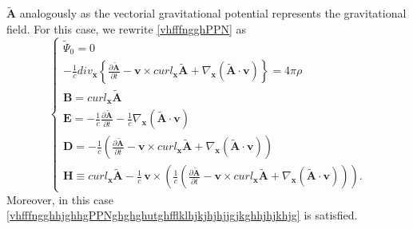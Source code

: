 \documentclass{article}
\theoremstyle{definition}
\theoremstyle{remark}
\renewcommand{\vec}[1]{\mathbf{#1}}
\newcommand{\er}{\eqref}
\newcommand{\er}{\eqref}
\begin{document}
$\tilde{\vec A}$ analogously as the vectorial gravitational
potential represents the gravitational field. For this case, we
rewrite \er{vhfffngghPPN} as
\begin{equation}\label{vhfffngghPPNhjkhj}
\begin{cases}
\tilde\Psi_0=0\\
-\frac{1}{c}div_{\vec x}\left\{\frac{\partial\tilde{\vec
A}}{\partial t}-\vec v\times curl_{\vec x}\tilde{\vec
A}+\nabla_{\vec x}\left(\tilde{\vec A}\cdot\vec
v\right)\right\}=4\pi \rho
\\
\vec B= curl_{\vec x} \tilde{\vec A}\\
\vec E=-\frac{1}{c}\frac{\partial\tilde{\vec A}}{\partial
t}-\frac{1}{c}\nabla_{\vec x}\left(\tilde{\vec A}\cdot\vec v\right)
\\
 \vec D=-\frac{1}{c}\left(\frac{\partial\tilde{\vec A}}{\partial
t}-\vec v\times curl_{\vec x}\tilde{\vec A}+\nabla_{\vec
x}\left(\tilde{\vec A}\cdot\vec v\right)\right)
\\
\vec H\equiv curl_{\vec x} \tilde{\vec A}-\frac{1}{c}\,\vec v\times
\left(\frac{1}{c}\left(\frac{\partial\tilde{\vec A}}{\partial
t}-\vec v\times curl_{\vec x}\tilde{\vec A}+\nabla_{\vec
x}\left(\tilde{\vec A}\cdot\vec v\right)\right)\right).
\end{cases}
\end{equation}
Moreover, in this case
\er{vhfffngghhjghhgPPNghghghutghfflklhjkjhjhjjgjkghhjhjkhjg} is
satisfied.
%
%
%
\begin{comment}
Next by the second equation in \er{vhfffngghPPNhjkhj} and by
\er{vhfffngghhjghhgjlkhjhkPPP} in Proposition \ref{yghgjtgyrtrt} we
deduce
\begin{multline}\label{hbuy8uiyhiyh}
-4\pi c\rho=div_{\vec x}\left\{\frac{\partial\tilde{\vec
A}}{\partial t}-\vec v\times curl_{\vec x}\tilde{\vec
A}+\nabla_{\vec x}\left(\tilde{\vec A}\cdot\vec
v\right)\right\}=\\div_{\vec x}\left\{\frac{\partial\vec A}{\partial
t}+\left(div_{\vec x}\vec A\right)\vec v-\left(div_{\vec x}\vec
v\right)\vec A+ \left(d_{\vec x}\vec v+\left\{d_{\vec x}\vec
v\right\}^T\right)\cdot\vec A\right\} =\\
\frac{\partial}{\partial t}\left(div_{\vec x}\vec A\right)+div_{\vec
x}\left\{\left(div_{\vec x}\vec A\right)\vec v-\left(div_{\vec
x}\vec v\right)\vec A+ \left(d_{\vec x}\vec v+\left\{d_{\vec x}\vec
v\right\}^T\right)\cdot\vec A\right\}
\end{multline}
\end{comment}
%
%
%
%
%
%
\end{document}
